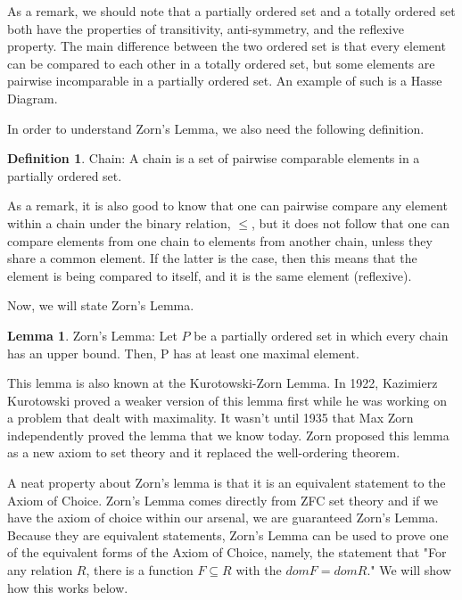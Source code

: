 \documentclass[12pt]{article}
\theoremstyle{definition}
\newtheorem{definition}{Definition}
\newtheorem{lemma}{Lemma}
\begin{document}
	As a remark, we should note that a partially ordered set and a totally ordered set both have the properties of transitivity, anti-symmetry, and the reflexive property. The main difference between the two ordered set is that every element can be compared to each other in a totally ordered set, but some elements are pairwise incomparable in a partially ordered set. An example of such is a Hasse Diagram. 
	
	In order to understand Zorn's Lemma, we also need the following definition.
	
	\theoremstyle{definition}
	\begin{definition}{Chain:} A chain is a set of pairwise comparable elements in a partially ordered set.
	\end{definition}
	
	As a remark, it is also good to know that one can pairwise compare any element within a chain under the binary relation, $\leq$, but it does not follow that one can compare elements from one chain to elements from another chain, unless they share a common element. If the latter is the case, then this means that the element is being compared to itself, and it is the same element (reflexive).
	
	Now, we will state Zorn's Lemma.
	
	\theoremstyle{definition}
	\begin{lemma}
	Zorn's Lemma: Let $P$ be a partially ordered set in which every chain has an upper bound. Then, P has at least one maximal element.
	\end{lemma}	
	
	This lemma is also known at the Kurotowski-Zorn Lemma. In 1922, Kazimierz Kurotowski proved a weaker version of this lemma first while he was working on a problem that dealt with maximality. It wasn't until 1935 that Max Zorn independently proved the lemma that we know today. Zorn proposed this lemma as a new axiom to set theory and it replaced the well-ordering theorem.
	
	A neat property about Zorn's lemma is that it is an equivalent statement to the Axiom of Choice. Zorn's Lemma comes directly from ZFC set theory and if we have the axiom of choice within our arsenal, we are guaranteed Zorn's Lemma. Because they are equivalent statements, Zorn's Lemma can be used to prove one of the equivalent forms of the Axiom of Choice, namely, the statement that "For any relation $R$, there is a function $F \subseteq R$ with the $dom F = dom R$." We will show how this works below.
	
\end{document}

